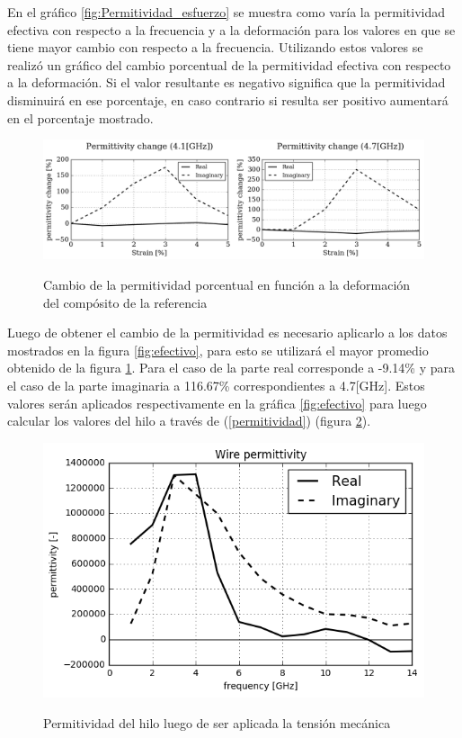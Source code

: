 \documentclass[12pt,letterpaper]{article}
\numberwithin{equation}{section}
\begin{document}
En el gráfico \ref{fig:Permitividad_esfuerzo} se muestra como varía la permitividad efectiva con respecto a la frecuencia y a la deformación para los valores en que se tiene mayor cambio con respecto a la frecuencia. Utilizando estos valores se realizó un gráfico del cambio porcentual de la permitividad efectiva con respecto a la deformación. Si el valor resultante es negativo significa que la permitividad disminuirá en ese porcentaje, en caso contrario si resulta ser positivo aumentará en el porcentaje mostrado.

\begin{figure}[H]
	\centering\includegraphics[scale=0.6]{Imagenes/permittivitychange.png}\\
	\caption{Cambio de la permitividad porcentual en función a la deformación del compósito de la referencia \cite{Wire_backgound} }
	\label{fig:permittivitychange}
\end{figure} 

Luego de obtener el cambio de la permitividad es necesario aplicarlo a los datos mostrados en la figura \ref{fig:efectivo}, para esto se utilizará el mayor promedio obtenido de la figura \ref{fig:permittivitychange}. Para el caso de la parte real corresponde a -9.14\% y para el caso de la parte imaginaria a 116.67\% correspondientes a  4.7[GHz]. Estos valores serán aplicados respectivamente en la gráfica \ref{fig:efectivo} para luego calcular los valores del hilo a través de (\ref{permitividad}) (figura \ref{fig:permittivitycstress}).

\begin{figure}[H]
	\centering\includegraphics[scale=1.]{Imagenes/wire_permittivity_stress.png}\\
	\caption{Permitividad del hilo luego de ser aplicada la tensión mecánica}
	\label{fig:permittivitycstress}
\end{figure} 
\end{document}
